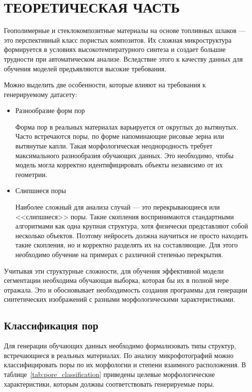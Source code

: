 \documentclass[code]{wordcore}
\begin{document}
\section{ТЕОРЕТИЧЕСКАЯ ЧАСТЬ}

Геополимерные и стеклокомпозитные материалы на основе топливных шлаков --- это перспективный класс пористых композитов. Их сложная микроструктура формируется в условиях высокотемпературного синтеза и создает большие трудности при автоматическом анализе. Вследствие этого к качеству данных для обучения моделей предъявляются высокие требования.

Можно выделить две особенности, которые влияют на требования к генерируемому датасету:

\begin{itemize}
	\item Разнообразие форм пор

	      Форма пор в реальных материалах варьируется от округлых до вытянутых. Часто встречаются поры, по форме напоминающие рисовые зерна или вытянутые капли. Такая морфологическая неоднородность требует максимального разнообразия обучающих данных. Это необходимо, чтобы модель могла корректно идентифицировать объекты независимо от их геометрии.

	\item Слипшиеся поры

	      Наиболее сложный для анализа случай --- это перекрывающиеся или <<слипшиеся>> поры. Такие скопления воспринимаются стандартными алгоритмами как одна крупная структура, хотя физически представляют собой несколько объектов. Поэтому нейросеть должна научиться не просто находить такие скопления, но и корректно разделять их на составляющие. Для этого необходимо обучение на примерах с различной степенью перекрытия.

\end{itemize}

Учитывая эти структурные сложности, для обучения эффективной модели сегментации необходима обучающая выборка, которая бы их в полной мере отражала. Это и обосновывает необходимость создания программы для генерации синтетических изображений с разными морфологическими характеристиками.

\subsection{Классификация пор}

Для генерации обучающих данных необходимо формализовать типы структур, встречающиеся в реальных материалах. По анализу микрофотографий можно классифицировать поры по их морфологии и степени взаимного расположения. В таблице~\ref{tab:pore_classification} приведены целевые морфологические характеристики, которым должны соответствовать генерируемые поры.
\end{document}
